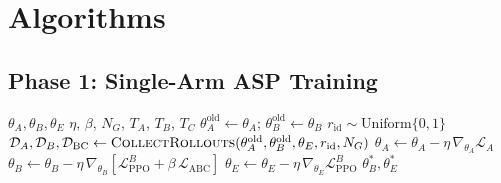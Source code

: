 \documentclass[12pt, a4paper]{article}
\newcommand{\calL}{\mathcal{L}}
\newcommand{\calD}{\mathcal{D}}
\begin{document}
\section{Algorithms}
\label{sec:algorithms}

\subsection{Phase 1: Single-Arm ASP Training}
\label{subsec:alg_phase1}

\begin{algorithm}[H]
\caption{Phase 1 — Single-Arm ASP with Goal Encoder}
\label{alg:phase1}
\begin{algorithmic}[1]
\Require $\theta_A, \theta_B, \theta_E$ 
\Require $\eta$, $\beta$, $N_G$, $T_A$, $T_B$, $T_C$ 
    \State $\theta_{A}^{\mathrm{old}} \leftarrow \theta_A$;\quad
           $\theta_{B}^{\mathrm{old}} \leftarrow \theta_B$
        \State $r_{\mathrm{id}} \sim \mathrm{Uniform}\{0, 1\}$
        \State $\calD_A, \calD_B, \calD_{\mathrm{BC}} \leftarrow
               \textsc{CollectRollouts}(\theta_A^{\mathrm{old}}, \theta_B^{\mathrm{old}}, \theta_E, r_{\mathrm{id}}, N_G)$
    \EndFor
    \State $\theta_A \leftarrow \theta_A - \eta\,\nabla_{\theta_A}\calL_A$
    \State $\theta_B \leftarrow \theta_B - \eta\,\nabla_{\theta_B}[\calL_{\mathrm{PPO}}^B + \beta\,\calL_{\mathrm{ABC}}]$
    \State $\theta_E \leftarrow \theta_E - \eta\,\nabla_{\theta_E}\calL_{\mathrm{PPO}}^B$
\EndFor
\State \Return $\theta_B^*, \theta_E^*$ 
\end{algorithmic}
\end{algorithm}
\end{document}
